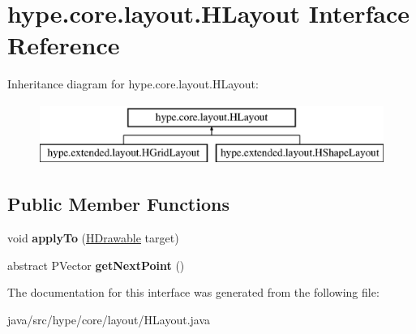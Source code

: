 \hypertarget{interfacehype_1_1core_1_1layout_1_1_h_layout}{\section{hype.\-core.\-layout.\-H\-Layout Interface Reference}
\label{interfacehype_1_1core_1_1layout_1_1_h_layout}
}
Inheritance diagram for hype.\-core.\-layout.\-H\-Layout\-:\begin{figure}[H]
\begin{center}
\leavevmode
\includegraphics[height=2.000000cm]{interfacehype_1_1core_1_1layout_1_1_h_layout}
\end{center}
\end{figure}
\subsection*{Public Member Functions}
\begin{DoxyCompactItemize}
\item 
\hypertarget{interfacehype_1_1core_1_1layout_1_1_h_layout_aebaab47c094c337293bb044ffcf88daf}{void {\bfseries apply\-To} (\hyperlink{classhype_1_1core_1_1drawable_1_1_h_drawable}{H\-Drawable} target)}\label{interfacehype_1_1core_1_1layout_1_1_h_layout_aebaab47c094c337293bb044ffcf88daf}

\item 
\hypertarget{interfacehype_1_1core_1_1layout_1_1_h_layout_a8f10994718492a1ca730109d0c3ca9e3}{abstract P\-Vector {\bfseries get\-Next\-Point} ()}\label{interfacehype_1_1core_1_1layout_1_1_h_layout_a8f10994718492a1ca730109d0c3ca9e3}

\end{DoxyCompactItemize}


The documentation for this interface was generated from the following file\-:\begin{DoxyCompactItemize}
\item 
java/src/hype/core/layout/H\-Layout.\-java\end{DoxyCompactItemize}
